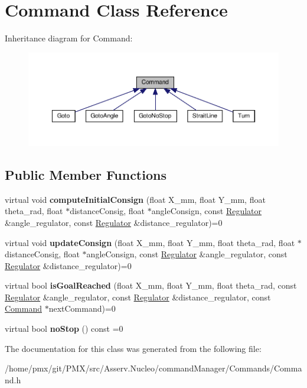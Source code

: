 \hypertarget{classCommand}{}\section{Command Class Reference}
\label{classCommand}


Inheritance diagram for Command\+:
\nopagebreak
\begin{figure}[H]
\begin{center}
\leavevmode
\includegraphics[width=350pt]{classCommand__inherit__graph}
\end{center}
\end{figure}
\subsection*{Public Member Functions}
\begin{DoxyCompactItemize}
\item 
\mbox{\label{classCommand_af53b158f04b3365121e13089bae3ac4c}} 
virtual void {\bfseries compute\+Initial\+Consign} (float X\+\_\+mm, float Y\+\_\+mm, float theta\+\_\+rad, float $\ast$distance\+Consig, float $\ast$angle\+Consign, const \hyperlink{classRegulator}{Regulator} \&angle\+\_\+regulator, const \hyperlink{classRegulator}{Regulator} \&distance\+\_\+regulator)=0
\item 
\mbox{\label{classCommand_a4133e858678d66a27ab7c5a36f3db562}} 
virtual void {\bfseries update\+Consign} (float X\+\_\+mm, float Y\+\_\+mm, float theta\+\_\+rad, float $\ast$distance\+Consig, float $\ast$angle\+Consign, const \hyperlink{classRegulator}{Regulator} \&angle\+\_\+regulator, const \hyperlink{classRegulator}{Regulator} \&distance\+\_\+regulator)=0
\item 
\mbox{\label{classCommand_a29ffe79b7fd80917507dcd9bd5b594a2}} 
virtual bool {\bfseries is\+Goal\+Reached} (float X\+\_\+mm, float Y\+\_\+mm, float theta\+\_\+rad, const \hyperlink{classRegulator}{Regulator} \&angle\+\_\+regulator, const \hyperlink{classRegulator}{Regulator} \&distance\+\_\+regulator, const \hyperlink{classCommand}{Command} $\ast$next\+Command)=0
\item 
\mbox{\label{classCommand_ac794c0acebfc1ec4062ec47b80de8d66}} 
virtual bool {\bfseries no\+Stop} () const =0
\end{DoxyCompactItemize}


The documentation for this class was generated from the following file\+:\begin{DoxyCompactItemize}
\item 
/home/pmx/git/\+P\+M\+X/src/\+Asserv.\+Nucleo/command\+Manager/\+Commands/Command.\+h\end{DoxyCompactItemize}
